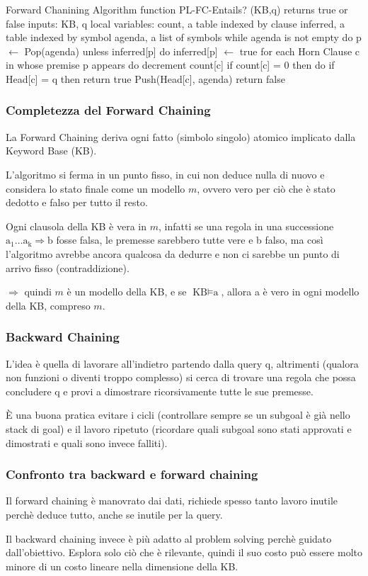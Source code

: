 \documentclass[11pt, a4paper]{article}
\begin{document}
  \begin{codice}{Forward Chanining Algorithm}
    function PL-FC-Entails? (KB,q) returns true or false
      inputs: KB, q
      local variables: count, a table indexed by clause
                       inferred, a table indexed by symbol
                       agenda, a list of symbols
      while agenda is not empty do
        p $\leftarrow$ Pop(agenda)
        unless inferred[p] do
          inferred[p] $\leftarrow$ true
          for each Horn Clause c in whose premise p appears do
            decrement count[c]
            if count[c] = 0 then do
              if Head[c] = q then return true
              Push(Head[c], agenda)
      return false
  \end{codice}

  \subsubsection*{Completezza del Forward Chaining}

  La Forward Chaining deriva ogni fatto (simbolo singolo) atomico implicato dalla Keyword Base (KB).

  L'algoritmo si ferma in un punto fisso, in cui non deduce nulla di nuovo e considera lo stato finale come un modello $m$, ovvero vero per ciò che è stato dedotto e falso per tutto il resto.

  Ogni clausola della KB è vera in $m$, infatti se una regola in una successione $\text{a}_1\dots\text{a}_\text{k}\Rightarrow\text{b}$ fosse falsa, le premesse sarebbero tutte vere e b falso, ma così l'algoritmo avrebbe ancora qualcosa da dedurre e non ci sarebbe un punto di arrivo fisso (contraddizione).

  $\Rightarrow$ quindi $m$ è un modello della KB, e se $\text{KB}\models\text{a}$, allora a è vero in ogni modello della KB, compreso $m$.

  \subsubsection*{Backward Chaining}

  L'idea è quella di lavorare all'indietro partendo dalla query q, altrimenti (qualora non funzioni o diventi troppo complesso) si cerca di trovare una regola che possa concludere q e provi a dimostrare ricorsivamente tutte le sue premesse.

  È una buona pratica evitare i cicli (controllare sempre se un subgoal è già nello stack di goal) e il lavoro ripetuto (ricordare quali subgoal sono stati approvati e dimostrati e quali sono invece falliti).

  \subsubsection*{Confronto tra backward e forward chaining}

  Il forward chaining è manovrato dai dati, richiede spesso tanto lavoro inutile perchè deduce tutto, anche se inutile per la query.

  Il backward chaining invece è più adatto al problem solving perchè guidato dall'obiettivo. Esplora solo ciò che è rilevante, quindi il suo costo può essere molto minore di un costo lineare nella dimensione della KB.
\end{document}
